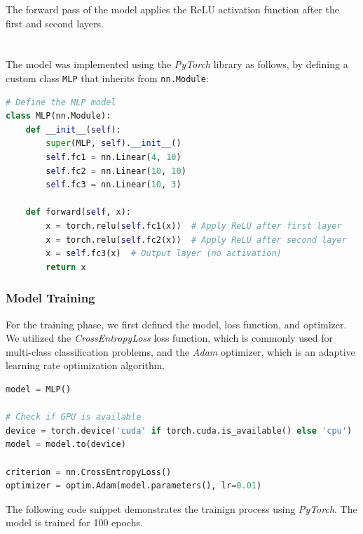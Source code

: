 \documentclass{article}
\begin{document}
The forward pass of the model applies the ReLU activation function after the first and second layers.  
\\\\\\The model was implemented using the \textit{PyTorch} library as follows, by defining a custom class \texttt{MLP} that inherits from \texttt{nn.Module}:

\begin{lstlisting}[language=Python]
# Define the MLP model
class MLP(nn.Module):
    def __init__(self):
        super(MLP, self).__init__()
        self.fc1 = nn.Linear(4, 10)
        self.fc2 = nn.Linear(10, 10)
        self.fc3 = nn.Linear(10, 3)
    
    def forward(self, x):
        x = torch.relu(self.fc1(x))  # Apply ReLU after first layer
        x = torch.relu(self.fc2(x))  # Apply ReLU after second layer
        x = self.fc3(x)  # Output layer (no activation)
        return x
\end{lstlisting}


\subsubsection{Model Training}
For the training phase, we first defined the model, loss function, and optimizer.
We utilized the \textit{CrossEntropyLoss} loss function, which is commonly used for multi-class classification problems, and the \textit{Adam} optimizer, which is an adaptive learning rate optimization algorithm.

\begin{lstlisting}[language=Python]
model = MLP()

# Check if GPU is available
device = torch.device('cuda' if torch.cuda.is_available() else 'cpu')
model = model.to(device)

criterion = nn.CrossEntropyLoss()
optimizer = optim.Adam(model.parameters(), lr=0.01)
\end{lstlisting}

The following code snippet demonstrates the trainign process using \textit{PyTorch}. The model is trained for 100 epochs.
\end{document}
